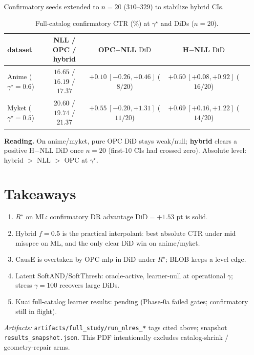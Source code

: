 \documentclass[11pt,a4paper]{article}
\newcommand{\Rstar}{R^{\star}}
\newcommand{\gstar}{\gamma^{\star}}
\newcommand{\DiD}{\mathrm{DiD}}
\begin{document}
Confirmatory seeds extended to \(n{=}20\) (\(310\)--\(329\)) to stabilize hybrid CIs.

\begin{table}[h]
\centering
\caption{Full-catalog confirmatory CTR (\%) at \(\gstar\) and DiDs (\(n{=}20\)).}
\footnotesize
\begin{tabular}{@{}lcccc@{}}
\toprule
dataset & NLL / OPC / hybrid & OPC$-$NLL \(\DiD\) & H$-$NLL \(\DiD\) \\
\midrule
Anime (\(\gstar{=}0.6\)) &
\(16.65\) / \(16.19\) / \(\mathbf{17.37}\) &
\(+0.10\ [-0.26,+0.46]\) (\(8/20\)) &
\(\mathbf{+0.50}\ [+0.08,+0.92]\) (\(16/20\)) \\
Myket (\(\gstar{=}0.5\)) &
\(20.60\) / \(19.74\) / \(\mathbf{21.37}\) &
\(+0.55\ [-0.20,+1.31]\) (\(11/20\)) &
\(\mathbf{+0.69}\ [+0.16,+1.22]\) (\(14/20\)) \\
\bottomrule
\end{tabular}
\end{table}

\noindent
\textbf{Reading.} On anime/myket, pure OPC DiD stays weak/null; \textbf{hybrid} clears a positive
H$-$NLL DiD once \(n{=}20\) (first-10 CIs had crossed zero). Absolute level: hybrid \(>\) NLL \(>\) OPC
at \(\gstar\).

\section{Takeaways}
\begin{enumerate}[leftmargin=1.4em,itemsep=0.25em]
  \item \(\Rstar\) on ML: confirmatory DR advantage \(\DiD{=}+1.53\) pt is solid.
  \item Hybrid \(f{=}0.5\) is the practical interpolant: best absolute CTR under mid misspec on ML,
        and the only clear DiD win on anime/myket.
  \item CausE is overtaken by OPC-mlp in DiD under \(\Rstar\); BLOB keeps a level edge.
  \item Latent SoftAND/SoftThresh: oracle-active, learner-null at operational \(\gamma\);
        stress \(\gamma{=}100\) recovers large DiDs.
  \item Kuai full-catalog learner results: pending (Phase-0a failed gates; confirmatory still in flight).
\end{enumerate}

\vspace{1em}
\noindent\textit{Artifacts:} \texttt{artifacts/full\_study/run\_nlres\_*} tags cited above;
snapshot \texttt{results\_snapshot.json}. This PDF intentionally excludes catalog-shrink /
geometry-repair arms.
\end{document}
